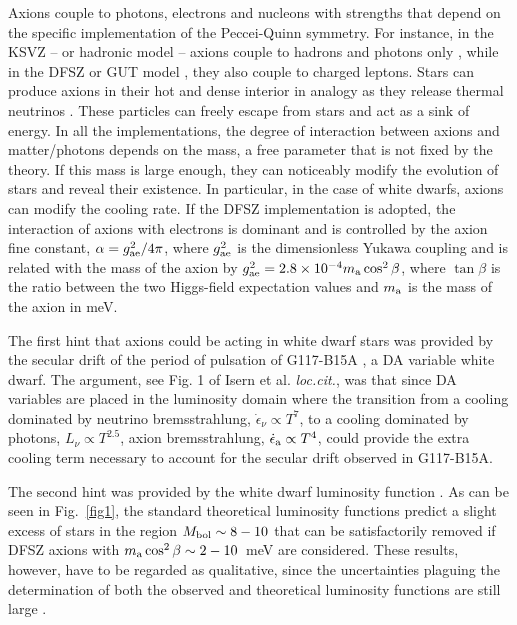 \documentclass[useAMS,usenatbib]{mnras}
\begin{document}
Axions couple to  photons, electrons and nucleons  with strengths that
depend on  the specific  implementation of the  Peccei-Quinn symmetry.
For instance,  in the KSVZ  -- or hadronic  model -- axions  couple to
hadrons and  photons only \citep{kim79,shif80},  while in the  DFSZ or
GUT  model   \citep{dine81,zhit80},  they   also  couple   to  charged
leptons. Stars can produce axions in their hot and dense interior in analogy
  as they release thermal  neutrinos \citep{raff96}.  These
particles can  freely escape from stars  and act as a  sink of energy.
In all the implementations, the degree of interaction between axions 
and matter/photons depends on the mass, a free parameter that is not fixed by the theory.
If  this  mass  is  large  enough, they  can  noticeably  modify  the
evolution of stars and reveal  their existence.  In particular, in the
case of white  dwarfs, axions can modify the cooling  rate. If the DFSZ 
implementation is adopted, the interaction of axions with electrons is dominant and 
is controlled by the axion fine constant, $\alpha = g^2_{\rm ae}/4\pi$, where  $g^2_{\rm ae}$ 
is the dimensionless Yukawa coupling and is related with the mass of the axion by
  $g^2_{\rm ae}= 2.8\times 10^{-4} m_{\rm a} \cos^2 \beta$, where $\tan \beta$ is 
the ratio between the two Higgs-field expectation values
and $m_{\rm a}$ is the mass of the axion in meV.

The first hint that axions could be acting in white dwarf stars  was provided 
by the secular drift of the period  of pulsation  of G117-B15A  \citep{iser92}, a  DA variable
white dwarf. The argument, see Fig. 1 of Isern et al. \emph{loc.cit.}, was that since DA variables are placed in the luminosity domain where the transition from a cooling dominated by neutrino bremsstrahlung, $\dot\epsilon _\nu \propto T^7$, to a cooling dominated 
by photons, $L_\nu \propto T^{2.5}$, axion bremsstrahlung, $\dot\epsilon _{\rm a} \propto T^4$, could provide the extra cooling term necessary to account for the secular drift observed in G117-B15A.

The second hint was provided by the white dwarf luminosity
function \citep{iser08a}.  As can be seen  in Fig.~\ref{fig1}, the
standard theoretical  luminosity functions predict a  slight excess of
stars  in  the  region  $M_{\rm  bol}   \sim  8  -  10$  that  can  be
satisfactorily removed  if DFSZ  axions with  $m_{\rm a}  \cos^2 \beta
\sim  2 -  10$~meV are considered.  These results, however, have to be regarded as
qualitative,  since the  uncertainties plaguing  the determination  of
both the observed and theoretical luminosity functions are still large
\citep{iser09,mill14}.
\end{document}

